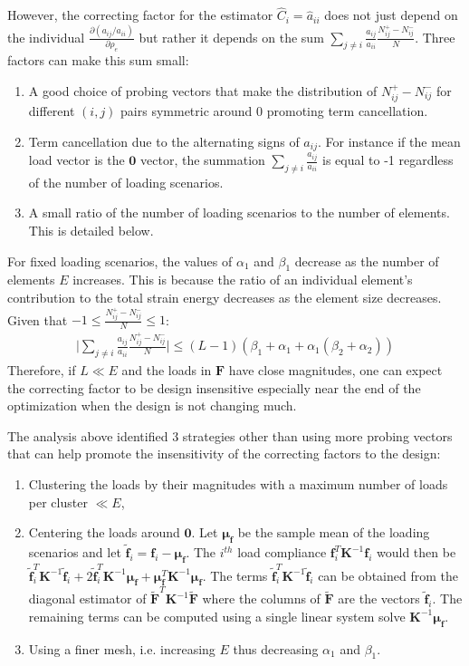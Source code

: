 However, the correcting factor for the estimator $\hat{C}_i = \hat{a}_{ii}$ does not just depend on the individual $\frac{\partial (a_{ij} / a_{ii})}{\partial \rho_e}$ but rather it depends on the sum $\sum_{j \neq i} \frac{a_{ij}}{a_{ii}} \frac{N^+_{ij} - N^-_{ij}}{N}$. Three factors can make this sum small:
\begin{enumerate}
  \item A good choice of probing vectors that make the distribution of $N^+_{ij} - N^-_{ij}$ for different $(i,j)$ pairs symmetric around 0 promoting term cancellation.
  \item Term cancellation due to the alternating signs of $a_{ij}$. For instance if the mean load vector is the $\bm{0}$ vector, the summation $\sum_{j \neq i} \frac{a_{ij}}{a_{ii}}$ is equal to -1 regardless of the number of loading scenarios.
  \item A small ratio of the number of loading scenarios to the number of elements. This is detailed below.
\end{enumerate}
For fixed loading scenarios, the values of $\alpha_1$ and $\beta_1$ decrease as the number of elements $E$ increases. This is because the ratio of an individual element's contribution to the total strain energy decreases as the element size decreases. Given that $-1 \leq \frac{N^+_{ij} - N^-_{ij}}{N} \leq 1$:
\begin{align}
  \Biggl|\sum_{j \neq i} \frac{a_{ij}}{a_{ii}} \frac{N^+_{ij} - N^-_{ij}}{N} \Biggr| \leq (L - 1)(\beta_1 + \alpha_1 + \alpha_1 (\beta_2 + \alpha_2))
\end{align}
Therefore, if $L \ll E$ and the loads in $\bm{F}$ have close magnitudes, one can expect the correcting factor to be design insensitive especially near the end of the optimization when the design is not changing much. 

The analysis above identified 3 strategies other than using more probing vectors that can help promote the insensitivity of the correcting factors to the design:
\begin{enumerate}
  \item Clustering the loads by their magnitudes with a maximum number of loads per cluster $\ll E$,
  \item Centering the loads around $\bm{0}$. Let $\bm{\mu}_{\bm{f}}$ be the sample mean of the loading scenarios and let $\tilde{\bm{f}}_i = \bm{f}_i - \bm{\mu}_{\bm{f}}$. The $i^{th}$ load compliance $\bm{f}_i^T \bm{K}^{-1} \bm{f}_i$ would then be $\tilde{\bm{f}}_i^T \bm{K}^{-1} \tilde{\bm{f}}_i + 2 \tilde{\bm{f}}_i^T \bm{K}^{-1} \bm{\mu}_{\bm{f}} + \bm{\mu}_{\bm{f}}^T \bm{K}^{-1} \bm{\mu}_{\bm{f}}$. The terms $\tilde{\bm{f}}_i^T \bm{K}^{-1} \tilde{\bm{f}}_i$ can be obtained from the diagonal estimator of $\tilde{\bm{F}}^T \bm{K}^{-1} \tilde{\bm{F}}$ where the columns of $\tilde{\bm{F}}$ are the vectors $\tilde{\bm{f}}_i$. The remaining terms can be computed using a single linear system solve $\bm{K}^{-1} \bm{\mu}_{\bm{f}}$.
  \item Using a finer mesh, i.e. increasing $E$ thus decreasing $\alpha_1$ and $\beta_1$.
\end{enumerate}

